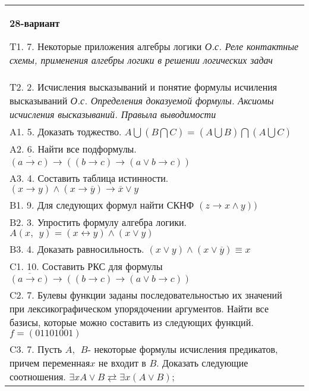 \documentclass{article}
\begin{document}
\begin{tabular}{m{17cm}}
\textbf{28-вариант}
\newline

T1. 7. Некоторые приложения алгебры логики \emph{О.с. Реле контактные схемы, применения алгебры логики в решении логических задач} \\
T2. 2. Исчисления высказываний и понятие формулы исчиления высказываний \emph{О.с. Определения доказуемой формулы. Аксиомы исчисления высказываний. Правыла выводимости} \\
A1. 5. Доказать тоджество. \(A\bigcup(B\bigcap C) = (A\bigcup B)\bigcap(A\bigcup C)\) \\
A2. 6. Найти все подформулы. \(\overline{(a \rightarrow c)} \rightarrow \left( (b \rightarrow c) \rightarrow (a \vee b \rightarrow c) \right)\) \\
A3. 4. Составить таблица истинности. \((x \rightarrow y) \land (x \rightarrow \overline{y}) \rightarrow \overline{x} \vee y\) \\
B1. 9. Для следующих формул найти СКНФ \((z \rightarrow x \land y))\) \\
B2. 3. Упростить формулу алгебра логики. \(A(x,\ \ y) = (x \leftrightarrow y) \land (x \vee y)\) \\
B3. 4. Доказать равносильность. \((x \vee y) \land (x \vee \overline{y}) \equiv x\) \\
C1. 10. Составить РКС для формулы \(\overline{(a \rightarrow c)} \rightarrow \left( (b \rightarrow c) \rightarrow (a \vee b \rightarrow c) \right)\) \\
C2. 7. Булевы функции заданы последовательностью их значений при лексикографическом упорядочении аргументов. Найти все базисы, которые можно составить из следующих функций. \(f = (01101001)\) \\
C3. 7. Пусть \(A,\ \ B\)- некоторые формулы исчисления предикатов, причем переменная\(x\) не входит в \(B\). Доказать следующие соотношения. \(\exists xA \vee B \rightleftarrows \exists x(A \vee B)\); \\

\end{tabular}
\vspace{1cm}
\end{document}

